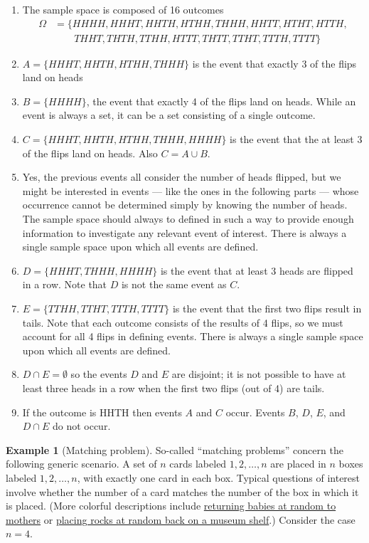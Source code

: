 \documentclass[
]{book}
\providecommand{\tightlist}{%
  \setlength{\itemsep}{0pt}\setlength{\parskip}{0pt}}
\theoremstyle{definition}
\theoremstyle{definition}
\newtheorem{example}{Example}[chapter]
\theoremstyle{definition}
\theoremstyle{remark}
\begin{document}
\begin{enumerate}
\def\labelenumi{\arabic{enumi}.}
\tightlist
\item
  The sample space is composed of 16 outcomes
  \begin{align*}
  \Omega & = \{HHHH, HHHT, HHTH, HTHH, THHH, HHTT, HTHT, HTTH,\\ 
  & \qquad THHT, THTH, TTHH, HTTT, THTT, TTHT, TTTH, TTTT\}
  \end{align*}
\item
  \(A = \{HHHT, HHTH, HTHH, THHH\}\) is the event that exactly 3 of the flips land on heads
\item
  \(B = \{HHHH\}\), the event that exactly 4 of the flips land on heads. While an event is always a set, it can be a set consisting of a single outcome.
\item
  \(C = \{HHHT, HHTH, HTHH, THHH, HHHH\}\) is the event that the at least 3 of the flips land on heads. Also \(C = A \cup B\).
\item
  Yes, the previous events all consider the number of heads flipped, but we might be interested in events --- like the ones in the following parts --- whose occurrence cannot be determined simply by knowing the number of heads. The sample space should always to defined in such a way to provide enough information to investigate any relevant event of interest. There is always a single sample space upon which all events are defined.
\item
  \(D = \{HHHT, THHH, HHHH\}\) is the event that at least 3 heads are flipped in a row. Note that \(D\) is not the same event as \(C\).
\item
  \(E = \{TTHH, TTHT, TTTH, TTTT\}\) is the event that the first two flips result in tails. Note that each outcome consists of the results of 4 flips, so we must account for all 4 flips in defining events. There is always a single sample space upon which all events are defined.
\item
  \(D\cap E=\emptyset\) so the events \(D\) and \(E\) are disjoint; it is not possible to have at least three heads in a row when the first two flips (out of 4) are tails.
\item
  If the outcome is HHTH then events \(A\) and \(C\) occur. Events \(B\), \(D\), \(E\), and \(D \cap E\) do not occur.
\end{enumerate}

\begin{example}[Matching problem]
\protect\hypertarget{exm:matching-event}{}{\label{exm:matching-event} {} }So-called ``matching problems'' concern the following generic scenario. A set of \(n\) cards labeled \(1, 2, \ldots, n\) are placed in \(n\) boxes labeled \(1, 2, \ldots, n\), with exactly one card in each box. Typical questions of interest involve whether the number of a card matches the number of the box in which it is placed. (More colorful descriptions include \href{http://www.rossmanchance.com/applets/randomBabies/RandomBabies.html}{returning babies at random to mothers} or \href{https://fivethirtyeight.com/features/everythings-mixed-up-can-you-sort-it-all-out/}{placing rocks at random back on a museum shelf}.) Consider the case \(n=4\).
\end{example}
\end{document}
